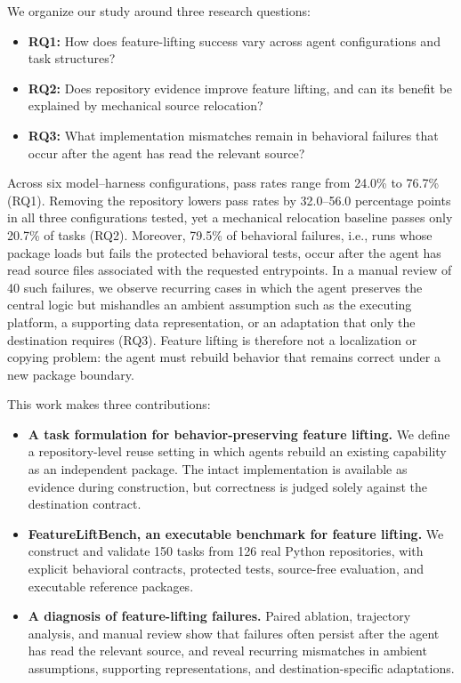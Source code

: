 \documentclass[acmsmall,screen,review,anonymous]{acmart}
\begin{document}
We organize our study around three research questions:
\begin{itemize}
  \item \textbf{RQ1:} How does feature-lifting success vary across agent
  configurations and task structures?
  \item \textbf{RQ2:} Does repository evidence improve feature lifting, and can
  its benefit be explained by mechanical source relocation?
  \item \textbf{RQ3:} What implementation mismatches remain in behavioral
  failures that occur after the agent has read the relevant source?
\end{itemize}
Across six model--harness configurations, pass rates range from 24.0\% to
76.7\% (RQ1). Removing the repository lowers pass rates by 32.0--56.0
percentage points in all three configurations tested, yet a mechanical
relocation baseline passes only 20.7\% of tasks (RQ2). Moreover, 79.5\% of
behavioral failures, i.e., runs whose package loads but fails the protected
behavioral tests, occur after the agent has read source files associated with
the requested entrypoints. In a manual review of 40 such failures, we observe
recurring cases in which the agent preserves the central logic but mishandles an
ambient assumption such as the executing platform, a supporting data
representation, or an adaptation that only the destination requires (RQ3). Feature lifting is therefore not a
localization or copying problem: the agent must rebuild behavior that remains
correct under a new package boundary.

This work makes three contributions:
\begin{itemize}
  \item \textbf{A task formulation for behavior-preserving feature lifting.}
  We define a repository-level reuse setting in which agents rebuild an existing
  capability as an independent package. The intact implementation is available
  as evidence during construction, but correctness is judged solely against the
  destination contract.

  \item \textbf{FeatureLiftBench, an executable benchmark for feature lifting.}
  We construct and validate 150 tasks from 126 real Python repositories, with
  explicit behavioral contracts, protected tests, source-free evaluation, and
  executable reference packages.

  \item \textbf{A diagnosis of feature-lifting failures.}
  Paired ablation, trajectory analysis, and manual review show that failures
  often persist after the agent has read the relevant source, and reveal
  recurring mismatches in ambient assumptions, supporting representations, and
  destination-specific adaptations.
\end{itemize}
\end{document}

